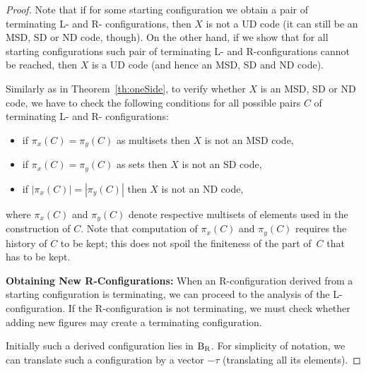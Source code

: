 \documentclass[final,nomarks]{dmtcs-episciences}
\begin{document}
\begin{proof}
Note that if for some starting configuration we obtain a pair of terminating L- and R-
configurations, then $X$ is not a UD code (it can still be an MSD, SD or ND code, though). 
On the other hand, if we show that for all starting configurations such pair of terminating L- 
and R-configurations cannot be reached, then $X$ is a UD code (and hence an MSD, SD 
and ND code).

Similarly as in Theorem~\ref{th:oneSide}, to verify whether $X$ is an MSD, SD or ND code, 
we have to check the following conditions for all possible pairs $C$ of terminating L- and R-
configurations:
\begin{itemize}
\item if $\pi_x(C) = \pi_y(C)$ as multisets then $X$ is not an MSD code,
\item if $\pi_x(C) = \pi_y(C)$ as sets then $X$ is not an SD code,
\item if $|\pi_x(C)| = |\pi_y(C)|$ then $X$ is not an ND code,
\end{itemize}
where $\pi_x(C)$ and $\pi_y(C)$ denote respective multisets of elements used in the 
construction of $C$. Note that computation of $\pi_x(C)$ and $\pi_y(C)$ requires the history 
of $C$ to be kept; this does not spoil the finiteness of the part
of~$C$ that has to be kept.


\textbf{Obtaining New R-Configurations:}
When an R-configuration derived from a starting configuration is terminating, we can proceed 
to the analysis of the L-configuration. If the R-configuration is not terminating, we must check 
whether adding new figures may create a terminating configuration.

Initially such a derived configuration lies in ${\mathrm B}_{\mathrm R}$. For simplicity of notation, we can 
translate such a configuration by a vector $-\tau$ (translating all its elements).



\end{proof}
\end{document}
